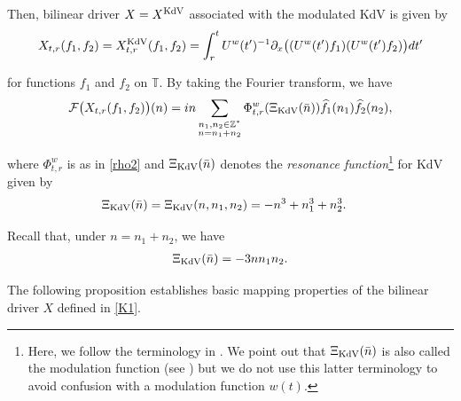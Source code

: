 \documentclass[letterpaper, 11pt,  reqno]{amsart}
\newcommand{\1}{\hspace{0.5mm}\text{I}\hspace{0.5mm}}
\newcommand{\noi}{\noindent}
\newcommand{\Z}{\mathbb{Z}}
\newcommand{\T}{\mathbb{T}}
\newcommand{\F}{\mathcal{F}}
\newcommand{\ft}{\widehat}
\newcommand{\uw}{U^w}
\newcommand{\KDV}{\text{\rm KdV} }
\numberwithin{equation}{section}
\numberwithin{theorem}{section}
\begin{document}
\noi
Then, 
bilinear driver $X= X^\KDV$ associated with the modulated KdV  is 
given by 
 \begin{align}
X_{t,r}(f_1,f_2)
= X^\KDV_{t,r}(f_1,f_2)
=\int_r^t  \uw(t')^{-1}  \partial_x
\big( (\uw(t')  f_1)( \uw(t') f_2 )\big) dt'
\label{K1}
\end{align}


\noi
for functions $f_1$ and $f_2$ on $\T$.
By taking the Fourier transform, we have
\begin{align}
\F\big(X_{t,r} (f_1,f_2)\big) (n)
= in \sum_{ \substack{n_1, n_2 \in \Z^*\\n = n_1+n_2}}
 \Phi^w_{t,r}(\Xi_\KDV (\bar n))
\ft f_1(n_1)  \ft f_2(n_2),
\label{K2}
\end{align}


\noi
where $\Phi^w_{t,r}$ is as in \eqref{rho2}
and $\Xi_\KDV (\bar n)$ denotes the {\it resonance function}\footnote{Here, we follow
the terminology in \cite{Tao2}.  
We point out that $\Xi_\KDV (\bar n)$ is also called the modulation function (see \cite{KOY})
but we do not use this latter terminology to avoid
confusion with a modulation function $w(t)$.
}
 for KdV given by 
\begin{align}
\Xi_\KDV (\bar n) &  = \Xi_\KDV (n,n_1,n_2) 
= - n^3+ n_1^3 +n_2^3.
\label{K3}
\end{align}

\noi
Recall that, under $n = n_1+ n_2$, we have
\begin{align}
\Xi_\KDV (\bar n) = - 3n n_1 n_2.
\label{K3a}
\end{align}


The following proposition establishes
basic mapping properties
of the bilinear driver $X$ defined in \eqref{K1}.
\end{document}
